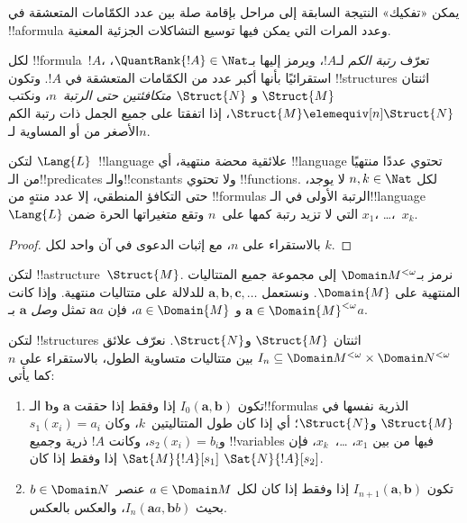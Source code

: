 \documentclass[../../../include/open-logic-section]{subfiles}
\begin{document}
يمكن «تفكيك» النتيجة السابقة إلى مراحل بإقامة صلة بين عدد الكمّامات
المتعشقة في !!a{formula} وعدد المرات التي يمكن فيها توسيع التشاكلات
الجزئية المعنية.

\begin{defn}
  لكل !!{formula}~$!A$، تعرّف \emph{رتبة الكم} لـ$!A$، ويرمز إليها
  بـ$\QuantRank{!A} \in \Nat$، استقرائيًا بأنها أكبر عدد من الكمّامات
  المتعشقة في $!A$. وتكون !!{structure}s اثنتان $\Struct{M}$ و
  $\Struct{N}$ \emph{متكافئتين حتى الرتبة~$n$}، ونكتب
  $\Struct{M} \elemequiv[n] \Struct{N}$، إذا اتفقتا على جميع الجمل ذات
  رتبة الكم الأصغر من أو المساوية لـ$n$.
\end{defn}

\begin{prop}
  لتكن $\Lang{L}$~!!{language} علائقية محضة منتهية، أي !!{language}
  تحتوي عددًا منتهيًا من الـ!!{predicate}s والـ!!{constant}s ولا تحتوي
  !!{function}s. لكل $n,k \in \Nat$ لا يوجد، حتى التكافؤ المنطقي، إلا
  عدد منتهٍ من !!{formula}s الرتبة الأولى في الـ!!{language}~$\Lang{L}$ التي لا تزيد
  رتبة كمها على~$n$ وتقع متغيراتها الحرة ضمن $x_1$، \dots،~$x_k$.
\end{prop}

\begin{proof}
  بالاستقراء على $n$، مع إثبات الدعوى في آن واحد لكل $k$.
\end{proof}

\begin{defn}
  لتكن !!a{structure}~$\Struct{M}$. نرمز بـ$\Domain M^{<\omega}$ إلى
  مجموعة جميع المتتاليات المنتهية على $\Domain{M}$. ونستعمل
  $\mathbf{a}, \mathbf{b}, \mathbf{c}, \ldots$ للدلالة على متتاليات
  منتهية. وإذا كانت $\mathbf{a} \in \Domain{M}^{<\omega}$ و
  $a \in \Domain{M}$، فإن $\mathbf{a}a$ تمثل \emph{وصل}
  $\mathbf{a}$ بـ$a$.
\end{defn}

\begin{defn}
  لتكن !!{structure}s اثنتان $\Struct{M}$ و$\Struct{N}$. نعرّف علائق
  $I_n \subseteq \Domain M^{<\omega} \times \Domain N^{<\omega}$ بين
  متتاليات متساوية الطول، بالاستقراء على $n$ كما يأتي:
   \begin{enumerate}
   \item تكون $I_0(\mathbf{a},\mathbf{b})$ إذا وفقط إذا حققت
     $\mathbf{a}$ و$\mathbf{b}$ الـ!!{formula}s الذرية نفسها في
     $\Struct{M}$ و$\Struct{N}$؛ أي إذا كان طول المتتاليتين~$k$، وكان
     $s_1(x_i)=a_i$ و$s_2(x_i)=b_i$، وكانت $!A$ ذرية وجميع
     !!{variable}s فيها من بين $x_1$، \dots،~$x_k$، فإن
     $\Sat{M}{!A}[s_1]$ إذا وفقط إذا كان $\Sat{N}{!A}[s_2]$.
   \item تكون $I_{n+1}(\mathbf{a},\mathbf{b})$ إذا وفقط إذا كان لكل
     $a\in \Domain M$ عنصر~$b\in \Domain N$ بحيث
     $I_n(\mathbf{a}a,\mathbf{b}b)$، والعكس بالعكس.
   \end{enumerate}
\end{defn}
\end{document}
